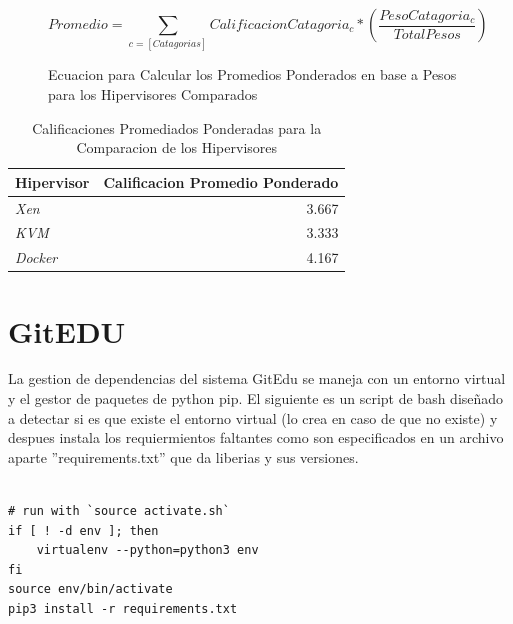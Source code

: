 \begin{figure}
	\[
		Promedio = \sum_{c = [Catagorias]} CalificacionCatagoria_c * \left ( \frac{PesoCatagoria_c}{TotalPesos} \right )
	\]
	\caption{Ecuacion para Calcular los Promedios Ponderados en base a Pesos para los Hipervisores Comparados}
    \label{fig:hipervisor-calif-equ}
\end{figure}

\begin{table}
	\centering
	\begin{tabular}{|l|r|}
    	\hline
		\textbf{Hipervisor} & \textbf{Calificacion Promedio Ponderado} \\
        \hline
        \textit{Xen} & 3.667 \\
        \hline
        \textit{KVM} & 3.333 \\
        \hline
        \textit{Docker} & 4.167 \\
        \hline
	\end{tabular}
    \caption{Calificaciones Promediados Ponderadas para la Comparacion de los Hipervisores}
    \label{tab:hipervisor-compar-promed}
\end{table}


\pagebreak



\section{GitEDU}

La gestion de dependencias del sistema GitEdu se maneja con un entorno virtual y el gestor de paquetes de python pip. El siguiente es un script de bash diseñado a detectar si es que existe el entorno virtual (lo crea en caso de que no existe) y despues instala los requiermientos faltantes como son especificados en un archivo aparte ''requirements.txt'' que da liberias y sus versiones.

\begin{lstlisting}

# run with `source activate.sh` 
if [ ! -d env ]; then
	virtualenv --python=python3 env
fi
source env/bin/activate
pip3 install -r requirements.txt

\end{lstlisting}

